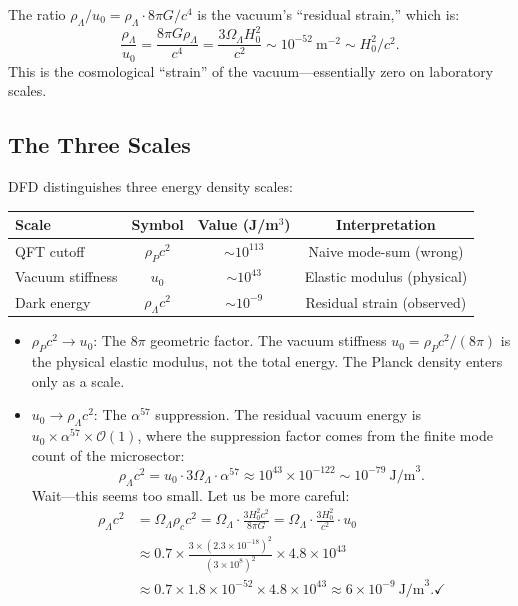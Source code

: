 \documentclass[11pt]{article}
\theoremstyle{plain}
\theoremstyle{definition}
\theoremstyle{remark}
\begin{document}
The ratio $\rho_\Lambda / u_0 = \rho_\Lambda \cdot 8\pi G / c^4$
is the vacuum's ``residual strain,'' which is:
\begin{equation}
\frac{\rho_\Lambda}{u_0} = \frac{8\pi G \rho_\Lambda}{c^4}
= \frac{3\Omega_\Lambda H_0^2}{c^2} \sim 10^{-52}~\text{m}^{-2}
\sim H_0^2/c^2.
\end{equation}
This is the cosmological ``strain'' of the vacuum---essentially zero
on laboratory scales.

\subsection{The Three Scales}

DFD distinguishes three energy density scales:

\begin{center}
\begin{tabular}{lccc}
\toprule
\textbf{Scale} & \textbf{Symbol} & \textbf{Value (J/m$^3$)} & \textbf{Interpretation} \\
\midrule
QFT cutoff & $\rho_P c^2$ & $\sim 10^{113}$ & Naive mode-sum (wrong) \\
Vacuum stiffness & $u_0$ & $\sim 10^{43}$ & Elastic modulus (physical) \\
Dark energy & $\rho_\Lambda c^2$ & $\sim 10^{-9}$ & Residual strain (observed) \\
\bottomrule
\end{tabular}
\end{center}

\begin{itemize}
\item \textbf{$\rho_P c^2 \to u_0$}: The $8\pi$ geometric factor.
The vacuum stiffness $u_0 = \rho_P c^2 / (8\pi)$ is the physical elastic
modulus, not the total energy. The Planck density enters only as a scale.

\item \textbf{$u_0 \to \rho_\Lambda c^2$}: The $\alpha^{57}$ suppression.
The residual vacuum energy is $u_0 \times \alpha^{57} \times
\mathcal{O}(1)$, where the suppression factor comes from the finite mode
count of the microsector:
\begin{equation}
\rho_\Lambda c^2 = u_0 \cdot 3\Omega_\Lambda \cdot \alpha^{57}
\approx 10^{43} \times 10^{-122} \sim 10^{-79}~\text{J/m}^3.
\end{equation}
Wait---this seems too small. Let us be more careful:
\begin{align}
\rho_\Lambda c^2 &= \Omega_\Lambda \rho_c c^2
= \Omega_\Lambda \cdot \frac{3H_0^2 c^2}{8\pi G}
= \Omega_\Lambda \cdot \frac{3H_0^2}{c^2} \cdot u_0 \nonumber\\
&\approx 0.7 \times \frac{3 \times (2.3 \times 10^{-18})^2}{(3 \times 10^8)^2}
\times 4.8 \times 10^{43} \nonumber\\
&\approx 0.7 \times 1.8 \times 10^{-52} \times 4.8 \times 10^{43}
\approx 6 \times 10^{-9}~\text{J/m}^3. \checkmark
\end{align}
\end{itemize}
\end{document}

